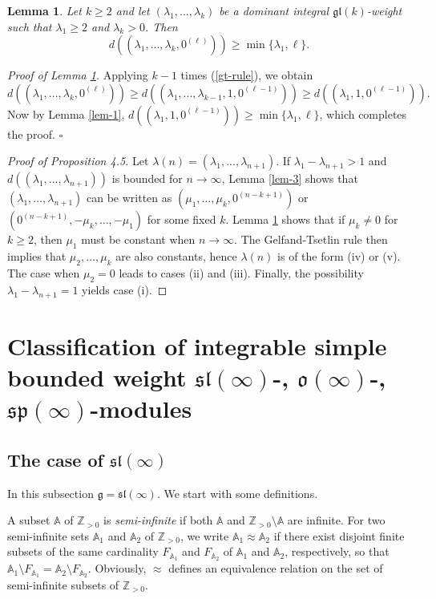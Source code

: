 \documentclass[12pt]{amsart}
\newcommand{\Z}{{\mathbb Z}}
\def\gg{\mathfrak{g}}
\def\gl{\mathfrak{l}}
\def\Z{\mathbb{Z}}
\newtheorem{lem}[thm]{Lemma}
\begin{document}
\begin{lem} \label{lem-4}
Let $k \geq 2$ and let $(\lambda_1,...,\lambda_k)$ be a dominant integral $\gg \gl (k)$-weight such that $\lambda_1 \geq 2$ and $\lambda_k>0$. Then 
$$
d((\lambda_1,...,\lambda_k, 0^{(\ell)})) \geq \min \{ \lambda_1, \ell\}.
$$ 
\end{lem}
\noindent\emph{Proof of Lemma \ref{lem-4}.} 
Applying $k-1$ times (\ref{gt-rule}), we obtain
$$
d((\lambda_1,...,\lambda_k, 0^{(\ell)})) \geq d((\lambda_1,...,\lambda_{k-1}, 1, 0^{(\ell-1)})) \geq d((\lambda_1, 1, 0^{(\ell-1)})).
$$
Now by Lemma \ref{lem-1}, $d((\lambda_1, 1, 0^{(\ell-1)})) \geq \min \{ \lambda_1, \ell\}$, which completes the proof.
\hfill $\square$
\begin{proof}[Proof of Proposition 4.5] Let $\lambda(n) = (\lambda_1,...,\lambda_{n+1})$. If $\lambda_1-\lambda_{n+1}>1$ and  $d((\lambda_1,\dots,\lambda_{n+1}))$ is bounded for $n\to\infty$, Lemma \ref{lem-3} shows that $(\lambda_1,\dots,\lambda_{n+1})$ can be written as $(\mu_1,\dots,\mu_k,0^{(n-k+1)})$ or $(0^{(n-k+1)},-\mu_k,\dots,-\mu_1)$ for some fixed $k$. Lemma \ref{lem-4} shows that if $\mu_k\neq 0$ for $k\geq 2$, then $\mu_1$ must be constant when $n\to \infty$. The Gelfand-Tsetlin rule then implies that $\mu_2,\dots, \mu_k$ are also constants, hence $\lambda(n)$ is of the form (iv) or (v). The case when $\mu_2=0$ leads to cases (ii) and (iii). Finally, the possibility $\lambda_1-\lambda_{n+1}=1$ yields case (i).
\end{proof}

\section{Classification of integrable simple bounded weight  $\mathfrak{sl} (\infty)$-, $\mathfrak{o}(\infty)$-, $\mathfrak{sp} (\infty)$-modules}

\subsection{The case of $\mathfrak{sl} (\infty)$} \label{subsec-int-sim-sl}

In this subsection $\gg = \mathfrak{sl} (\infty)$. We start with some definitions.

 A subset $\mathbb A$ of $\Z_{>0}$ is \emph{semi-infinite} if both $\mathbb A$ and $\Z_{>0} \setminus \mathbb A$ are infinite. For two semi-infinite sets $\mathbb A_1$ and $\mathbb A_2$ of $\Z_{>0}$, we write $\mathbb A_1 \approx \mathbb A_2$ if there exist disjoint finite subsets  of the same cardinality $F_{\mathbb A_1}$ and $F_{\mathbb A_2}$ of $\mathbb A_1$ and $\mathbb A_2$, respectively, so that $\mathbb A_1 \setminus F_{\mathbb A_1} = \mathbb A_2 \setminus F_{\mathbb A_2}$. Obviously, $\approx$ defines an equivalence relation on the set of semi-infinite subsets of $\Z_{>0}$.  
\end{document}
